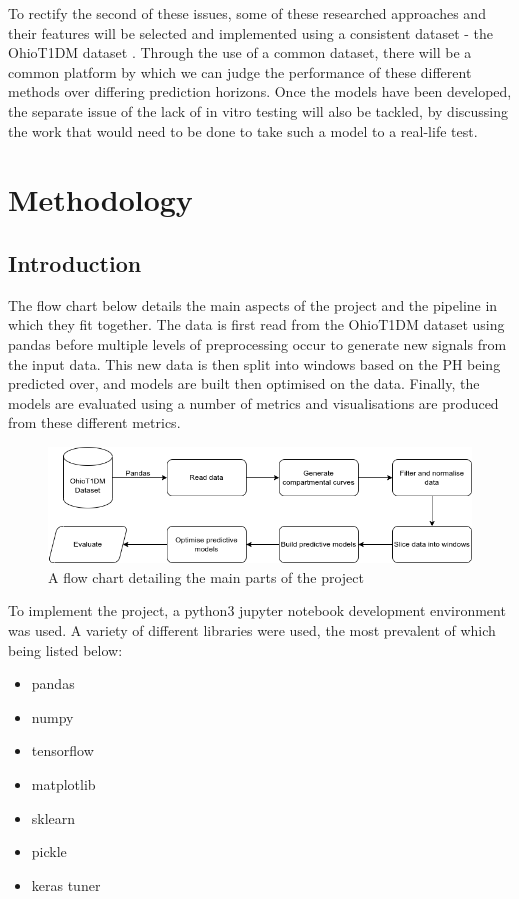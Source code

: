       To rectify the second of these issues, some of these researched approaches and their features will be selected and implemented using a consistent dataset - the OhioT1DM dataset \cite{ohio}. Through the use of a common dataset, there will be a common platform by which we can judge the performance of these different methods over differing prediction horizons. Once the models have been developed, the separate issue of the lack of in vitro testing will also be tackled, by discussing the work that would need to be done to take such a model to a real-life test.

\section{Methodology} %
    \subsection{Introduction}
      
    The flow chart below details the main aspects of the project and the pipeline in which they fit together. The data is first read from the OhioT1DM dataset using pandas before multiple levels of preprocessing occur to generate new signals from the input data. This new data is then split into windows based on the PH being predicted over, and models are built then optimised on the data. Finally, the models are evaluated using a number of metrics and visualisations are produced from these different metrics.

    \begin{figure}[H]
      \centering
      \includegraphics[width=\textwidth]{images/codeflow.png} 
      \caption{
       A flow chart detailing the main parts of the project
      }
    \end{figure}

    To implement the project, a python3 jupyter notebook development environment was used. A variety of different libraries were used, the most prevalent of which being listed below:
    \begin{itemize}
      \item pandas
      \item numpy
      \item tensorflow
      \item matplotlib
      \item sklearn
      \item pickle
      \item keras tuner
    \end{itemize}
  
